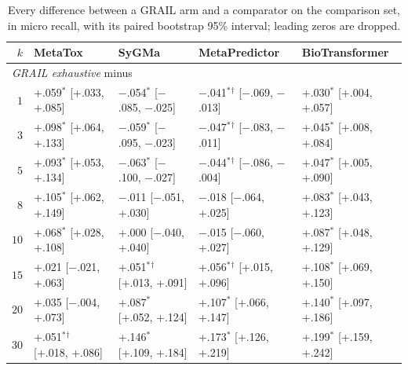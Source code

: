 \begin{table}[h]
\centering\scriptsize
\begin{threeparttable}
\caption{Every difference between a GRAIL arm and a comparator on the comparison set, in micro recall, with its paired bootstrap 95\% interval; leading zeros are dropped.}
\label{tab:si-intervals}
\setlength{\tabcolsep}{2.5pt}
\begin{tabular}{rllll}
\toprule
$k$ & MetaTox & SyGMa & MetaPredictor & BioTransformer \\
\midrule
\multicolumn{5}{l}{\emph{GRAIL exhaustive} minus} \\
$1$ & +.059$^{*}$\phantom{$^{\dagger}$} [+.033, +.085] & $-$.054$^{*}$\phantom{$^{\dagger}$} [$-$.085, $-$.025] & $-$.041$^{*}$$^{\dagger}$ [$-$.069, $-$.013] & +.030$^{*}$\phantom{$^{\dagger}$} [+.004, +.057] \\
$3$ & +.098$^{*}$\phantom{$^{\dagger}$} [+.064, +.133] & $-$.059$^{*}$\phantom{$^{\dagger}$} [$-$.095, $-$.023] & $-$.047$^{*}$$^{\dagger}$ [$-$.083, $-$.011] & +.045$^{*}$\phantom{$^{\dagger}$} [+.008, +.084] \\
$5$ & +.093$^{*}$\phantom{$^{\dagger}$} [+.053, +.134] & $-$.063$^{*}$\phantom{$^{\dagger}$} [$-$.100, $-$.027] & $-$.044$^{*}$$^{\dagger}$ [$-$.086, $-$.004] & +.047$^{*}$\phantom{$^{\dagger}$} [+.005, +.090] \\
$8$ & +.105$^{*}$\phantom{$^{\dagger}$} [+.062, +.149] & $-$.011\phantom{$^{*}$}\phantom{$^{\dagger}$} [$-$.051, +.030] & $-$.018\phantom{$^{*}$}\phantom{$^{\dagger}$} [$-$.064, +.025] & +.083$^{*}$\phantom{$^{\dagger}$} [+.043, +.123] \\
$10$ & +.068$^{*}$\phantom{$^{\dagger}$} [+.028, +.108] & +.000\phantom{$^{*}$}\phantom{$^{\dagger}$} [$-$.040, +.040] & $-$.015\phantom{$^{*}$}\phantom{$^{\dagger}$} [$-$.060, +.027] & +.087$^{*}$\phantom{$^{\dagger}$} [+.048, +.129] \\
$15$ & +.021\phantom{$^{*}$}\phantom{$^{\dagger}$} [$-$.021, +.063] & +.051$^{*}$$^{\dagger}$ [+.013, +.091] & +.056$^{*}$$^{\dagger}$ [+.015, +.096] & +.108$^{*}$\phantom{$^{\dagger}$} [+.069, +.150] \\
$20$ & +.035\phantom{$^{*}$}\phantom{$^{\dagger}$} [$-$.004, +.073] & +.087$^{*}$\phantom{$^{\dagger}$} [+.052, +.124] & +.107$^{*}$\phantom{$^{\dagger}$} [+.066, +.147] & +.140$^{*}$\phantom{$^{\dagger}$} [+.097, +.186] \\
$30$ & +.051$^{*}$$^{\dagger}$ [+.018, +.086] & +.146$^{*}$\phantom{$^{\dagger}$} [+.109, +.184] & +.173$^{*}$\phantom{$^{\dagger}$} [+.126, +.219] & +.199$^{*}$\phantom{$^{\dagger}$} [+.159, +.242] \\

\end{tabular}
\end{threeparttable}
\end{table}
